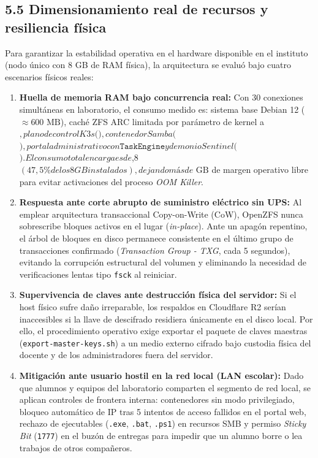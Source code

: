 \documentclass[10pt,a4paper]{article}
\begin{document}
\subsection{5.5 Dimensionamiento real de recursos y resiliencia física}
Para garantizar la estabilidad operativa en el hardware disponible en el instituto (nodo único con 8 GB de RAM física), la arquitectura se evaluó bajo cuatro escenarios físicos reales:
\begin{enumerate}
    \item \textbf{Huella de memoria RAM bajo concurrencia real:} Con 30 conexiones simultáneas en laboratorio, el consumo medido es: sistema base Debian 12 ($\approx 600\text{ MB}$), caché ZFS ARC limitada por parámetro de kernel a $, plano de control K3s ($$), contenedor Samba ($$), portal administrativo con \texttt{TaskEngine} y demonio Sentinel ($$). El consumo total en carga es de $,8$ (47,5\% de los 8 GB instalados), dejando más de \text{ GB}$ de margen operativo libre para evitar activaciones del proceso \textit{OOM Killer}.
    \item \textbf{Respuesta ante corte abrupto de suministro eléctrico sin UPS:} Al emplear arquitectura transaccional Copy-on-Write (CoW), OpenZFS nunca sobrescribe bloques activos en el lugar (\textit{in-place}). Ante un apagón repentino, el árbol de bloques en disco permanece consistente en el último grupo de transacciones confirmado (\textit{Transaction Group - TXG}, cada 5 segundos), evitando la corrupción estructural del volumen y eliminando la necesidad de verificaciones lentas tipo \texttt{fsck} al reiniciar.
    \item \textbf{Supervivencia de claves ante destrucción física del servidor:} Si el host físico sufre daño irreparable, los respaldos en Cloudflare R2 serían inaccesibles si la llave de descifrado residiera únicamente en el disco local. Por ello, el procedimiento operativo exige exportar el paquete de claves maestras (\texttt{export-master-keys.sh}) a un medio externo cifrado bajo custodia física del docente y de los administradores fuera del servidor.
    \item \textbf{Mitigación ante usuario hostil en la red local (LAN escolar):} Dado que alumnos y equipos del laboratorio comparten el segmento de red local, se aplican controles de frontera interna: contenedores sin modo privilegiado, bloqueo automático de IP tras 5 intentos de acceso fallidos en el portal web, rechazo de ejecutables (\texttt{.exe}, \texttt{.bat}, \texttt{.ps1}) en recursos SMB y permiso \textit{Sticky Bit} (\texttt{1777}) en el buzón de entregas para impedir que un alumno borre o lea trabajos de otros compañeros.
\end{enumerate}
\end{document}
